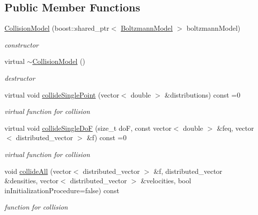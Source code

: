 \subsection*{Public Member Functions}
\begin{DoxyCompactItemize}
\item 
\hyperlink{classnatrium_1_1CollisionModel_a5afab5d75747f5239172a6d8a89affbe}{Collision\-Model} (boost\-::shared\-\_\-ptr$<$ \hyperlink{classnatrium_1_1BoltzmannModel}{Boltzmann\-Model} $>$ boltzmann\-Model)
\begin{DoxyCompactList}\small\item\em constructor \end{DoxyCompactList}\item 
\hypertarget{classnatrium_1_1CollisionModel_a2b1fb83814227db3b99d4d68a6657d52}{virtual \hyperlink{classnatrium_1_1CollisionModel_a2b1fb83814227db3b99d4d68a6657d52}{$\sim$\-Collision\-Model} ()}\label{classnatrium_1_1CollisionModel_a2b1fb83814227db3b99d4d68a6657d52}

\begin{DoxyCompactList}\small\item\em destructor \end{DoxyCompactList}\item 
virtual void \hyperlink{classnatrium_1_1CollisionModel_acde767e924eb2124ab3eb725543111e8}{collide\-Single\-Point} (vector$<$ double $>$ \&distributions) const =0
\begin{DoxyCompactList}\small\item\em virtual function for collision \end{DoxyCompactList}\item 
virtual void \hyperlink{classnatrium_1_1CollisionModel_aacc6f8b6590577eafa6461c290d2f33a}{collide\-Single\-Do\-F} (size\-\_\-t do\-F, const vector$<$ double $>$ \&feq, vector$<$ distributed\-\_\-vector $>$ \&f) const =0
\begin{DoxyCompactList}\small\item\em virtual function for collision \end{DoxyCompactList}\item 
void \hyperlink{classnatrium_1_1CollisionModel_a3d1bd3f792fea674f3bd5ca70a4e718e}{collide\-All} (vector$<$ distributed\-\_\-vector $>$ \&f, distributed\-\_\-vector \&densities, vector$<$ distributed\-\_\-vector $>$ \&velocities, bool in\-Initialization\-Procedure=false) const 
\begin{DoxyCompactList}\small\item\em function for collision \end{DoxyCompactList}\end{DoxyCompactItemize}
